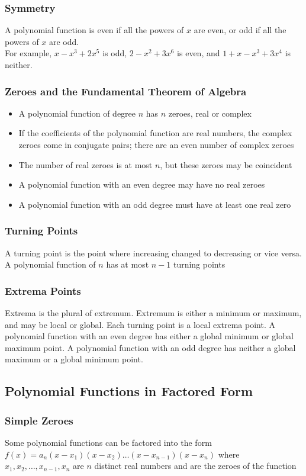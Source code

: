 \documentclass{article}
\begin{document}
	\subsubsection{Symmetry}
	A polynomial function is even if all the powers of $x$ are even, or odd if all the powers of $x$ are odd.\\
	For example, $x-x^3+2x^5$ is odd, $2-x^2+3x^6$ is even, and $1+x-x^3+3x^4$ is neither.
	\subsubsection{Zeroes and the Fundamental Theorem of Algebra}
	\begin{itemize}
		\item A polynomial function of degree $n$ has $n$ zeroes, real or complex
		\item If the coefficients of the polynomial function are real numbers, the complex zeroes come in conjugate pairs; there are an even number of complex zeroes
		\item The number of real zeroes is at most $n$, but these zeroes may be coincident
		\item A polynomial function with an even degree may have no real zeroes
		\item A polynomial function with an odd degree must have at least one real zero
	\end{itemize}
	\subsubsection{Turning Points}
	A turning point is the point where increasing changed to decreasing or vice versa. A polynomial function of $n$ has at most $n-1$ turning points
	\subsubsection{Extrema Points}
	Extrema is the plural of extremum. Extremum is either a minimum or maximum, and may be local or global. Each turning point is a local extrema point. A polynomial function with an even degree has either a global minimum or global maximum point. A polynomial function with an odd degree has neither a global maximum or a global minimum point.
	\subsection{Polynomial Functions in Factored Form}
	\subsubsection{Simple Zeroes}
	Some polynomial functions can be factored into the form $f(x)=a_n(x-x_1)(x-x_2)\dots(x-x_{n-1})(x-x_n)$ where $x_1, x_2, \dots, x_{n-1}, x_n$ are $n$ distinct real numbers and are the zeroes of the function
\end{document}
